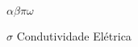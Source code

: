 \documentclass[csgeo,tcc, twoside]{unipampa}
\newcommand{\ven}[1]{\vec{\textrm{#1}}}                                         %
\begin{document}
\newpage\
\begin{listofsymbols}{$\alpha\beta\pi\omega$}
       \item[$\sigma$]                  Condutividade Elétrica
      
       
\end{listofsymbols}







\newpage\
\tableofcontents
\end{document}
